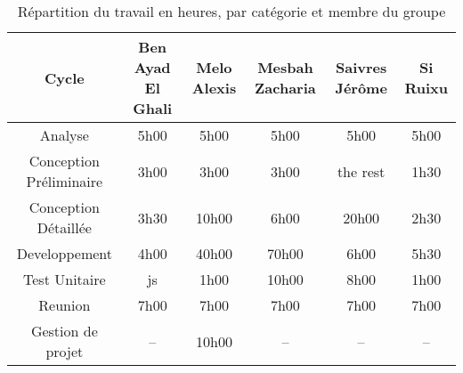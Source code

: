 \begin{table}
\caption{R\'epartition du travail en heures, par catégorie et membre du groupe}\par\medskip
\begin{tabular}{|*{6}{c|}}
    \hline
   	Cycle  & Ben Ayad El Ghali  & Melo Alexis  & Mesbah Zacharia  & Saivres Jérôme  & Si Ruixu \\
    \hline
    Analyse  & 5h00  & 5h00  & 5h00  &  5h00  & 5h00  \\
    \hline
   	Conception Préliminaire & 3h00  & 3h00  & 3h00  & the rest & 1h30 \\
    \hline
   	Conception Détaillée & 3h30  & 10h00  & 6h00  & 20h00  & 2h30 \\
    \hline
   	 Developpement & 4h00  & 40h00  &  70h00 & 6h00  & 5h30 \\
    \hline
   	 Test Unitaire  &js  & 1h00  & 10h00  & 8h00 & 1h00 \\
    \hline
   	 Reunion  & 7h00  & 7h00  & 7h00  & 7h00 & 7h00 \\
    \hline
   	 Gestion de projet & -- & 10h00  & --  & -- & -- \\
    \hline
\end{tabular}
\end{table}